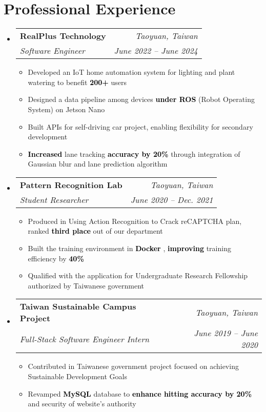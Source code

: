\documentclass[letterpaper,11pt]{article}
\makeatletter
\newcommand{\HL}[1]{
  \textbf{\textcolor{black}{#1}}
}
\newcommand{\subheadingtitlevspace}{
\vspace{-3pt}
}
\newcommand{\resumeItem}[1]{
  \item{
    {#1}\vspace{-4pt}
  }
}
\newcommand{\titleItem}[1]{
  \textbf{#1}
}
\newcommand{\resumeExpHeading}[4]{
    \item
    \begin{tabular*}{0.97\textwidth}{l@{\extracolsep{\fill}}r}
      \titleItem{#1} & \textit{ #2} \\
      \textit{#3} & \textit{ #4}
    \end{tabular*}\vspace{-8pt}
}
\newcommand{\resumeProjectHeading}[2]{
    \item
    \begin{tabular*}{0.97\textwidth}{l@{\extracolsep{\fill}}r}
      #1 & \textit{ #2}
    \end{tabular*}\vspace{-8pt}
}
\newcommand{\resumeSubHeadingListStart}{\subheadingtitlevspace\begin{itemize}[leftmargin=0in, label={}]}
\newcommand{\resumeSubHeadingListEnd}{\end{itemize}}
\newcommand{\resumeItemListStart}{
\begin{itemize}[label={$\bullet$}, labelsep=8pt, itemsep=4pt]}
\newcommand{\resumeItemListEnd}{
\end{itemize}\vspace{-8pt}}
\makeatother
\begin{document}
\section{Professional Experience}
  \resumeSubHeadingListStart
    \resumeExpHeading
      {RealPlus Technology}{Taoyuan, Taiwan}{Software Engineer}{June 2022 -- June 2024}
      \resumeItemListStart
        \resumeItem{Developed an IoT home automation system for lighting and plant watering to benefit \HL{200+} users}
        \resumeItem{Designed a data pipeline among devices \HL{under ROS} (Robot Operating System) on Jetson Nano}
        \resumeItem{Built APIs for self-driving car project, enabling flexibility for secondary development}
        \resumeItem{\HL{Increased} lane tracking \HL{accuracy by 20\%} through integration of Gaussian blur and lane prediction algorithm}
      \resumeItemListEnd
    \resumeExpHeading
      {Pattern Recognition Lab}{Taoyuan, Taiwan}{Student Researcher}{June 2020 -- Dec. 2021}
      \resumeItemListStart
        \resumeItem{Produced in Using Action Recognition to Crack reCAPTCHA plan, ranked \HL{third place} out of our department}
        \resumeItem{Built the training environment in \HL{Docker}, \HL{improving} training efficiency by \HL{40\%}}
        \resumeItem{Qualified with the application for Undergraduate Research Fellowship authorized by Taiwanese government}
      \resumeItemListEnd
    \resumeExpHeading
      {Taiwan Sustainable Campus Project}{Taoyuan, Taiwan}{Full-Stack Software Engineer Intern}{June 2019 -- June 2020}
      \resumeItemListStart
        \resumeItem{Contributed in Taiwanese government project focused on achieving Sustainable Development Goals}
        \resumeItem{Revamped \HL{MySQL} database to \HL{enhance hitting accuracy by 20\%} and security of website’s authority}
      \resumeItemListEnd
  \resumeSubHeadingListEnd


\end{document}
